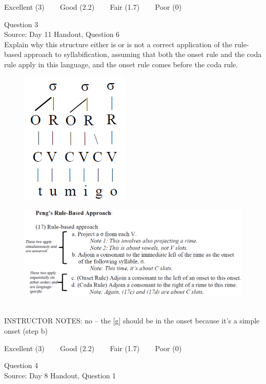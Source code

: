 \documentclass[12pt]{article}
\begin{document}
\vfill
Excellent (3) ~~~ Good (2.2) ~~~ Fair (1.7) ~~~ Poor (0)
\newpage

{\large Question 3}\\

Source: Day 11 Handout, Question 6\\

Explain why this structure either is or is not a correct application of the rule-based approach to syllabification, assuming that both the onset rule and the coda rule apply in this language, and the onset rule comes before the coda rule.\\

\begin{figure}[H]
\includegraphics{../images/pengrules_tumigo_no.png}
\end{figure}
\begin{figure}[H]
\includegraphics{../images/peng_rules.png}
\end{figure}

~\\
INSTRUCTOR NOTES: no -- the [g] should be in the onset because it's a simple onset (step b)


\vfill
Excellent (3) ~~~ Good (2.2) ~~~ Fair (1.7) ~~~ Poor (0)
\newpage

{\large Question 4}\\

Source: Day 8 Handout, Question 1\\
\end{document}
